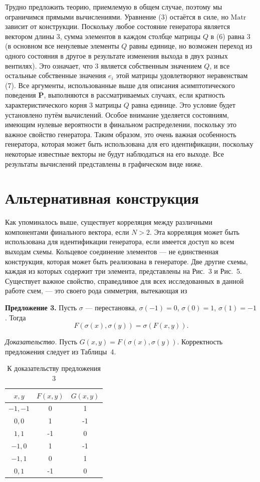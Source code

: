 \documentclass[a4paper,12pt]{article}
\begin{document}
Трудно предложить теорию, приемлемую в общем случае, поэтому мы ограничимся прямыми вычислениями. Уравнение (3) остаётся в силе, но $\mathrm{Matr}$ зависит от конструкции. Поскольку любое состояние генератора является вектором длины $3$, сумма элементов в каждом столбце матрицы $Q$ в (6) равна $3$ (в основном все ненулевые элементы $Q$ равны единице, но возможен переход из одного состояния в другое в результате изменения выхода в двух разных вентилях). Это означает, что $3$ является собственным значением $Q$, и все остальные собственные значения $e_i$ этой матрицы удовлетворяют неравенствам (7). Все аргументы, использованные выше для описания асимптотического поведения $\overline{\mathbf{P}}$, выполняются в рассматриваемых случаях, если кратность характеристического корня $3$ матрицы $Q$ равна единице. Это условие будет установлено путём вычислений. Особое внимание уделяется состояниям, имеющим нулевые вероятности в финальном распределении, поскольку это важное свойство генератора. Таким образом, это очень важная особенность генератора, которая может быть использована для его идентификации, поскольку некоторые известные векторы не будут наблюдаться на его выходе. Все результаты вычислений представлены в графическом виде ниже.

\section{Альтернативная конструкция}

Как упоминалось выше, существует корреляция между различными компонентами финального вектора, если $N>2$. Эта корреляция может быть использована для идентификации генератора, если имеется доступ ко всем выходам схемы. Кольцевое соединение элементов --- не единственная конструкция, которая может быть реализована в генераторе. Две другие схемы, каждая из которых содержит три элемента, представлены на Рис.~3 и Рис.~5. Существует важное свойство, справедливое для всех исследованных в данной работе схем, --- это своего рода симметрия, вытекающая из

\textbf{Предложение 3.} Пусть $\sigma$ --- перестановка, $\sigma(-1)=0$, $\sigma(0)=1$, $\sigma(1)=-1$. Тогда
\begin{equation}
F(\sigma(x), \sigma(y)) = \sigma(F(x,y)).
\label{eq:22}
\end{equation}

\textit{Доказательство.} Пусть $G(x,y) = F(\sigma(x), \sigma(y))$. Корректность предложения следует из Таблицы~4.

\begin{table}[h]
\centering
\caption{К доказательству предложения 3}
\label{tab:4}
\begin{tabular}{c|c|c}
$x, y$ & $F(x,y)$ & $G(x,y)$ \\ \hline
$-1, -1$ & 0 & 1 \\
$0, 0$ & 1 & -1 \\
$1, 1$ & -1 & 0 \\
$-1, 0$ & 1 & -1 \\
$-1, 1$ & 0 & 1 \\
$0, 1$ & -1 & 0
\end{tabular}
\end{table}
\end{document}
